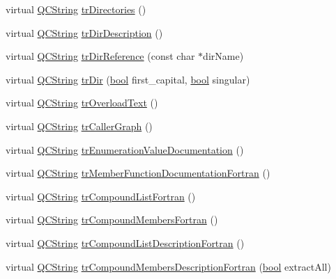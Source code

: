 \begin{DoxyCompactItemize}
virtual \hyperlink{class_q_c_string}{Q\+C\+String} \hyperlink{class_translator_czech_a5a70049ad39f783d34fdff2e6a289d40}{tr\+Directories} ()
\item 
virtual \hyperlink{class_q_c_string}{Q\+C\+String} \hyperlink{class_translator_czech_afee6a3bd8f2562a1e1c30fd668bf6255}{tr\+Dir\+Description} ()
\item 
virtual \hyperlink{class_q_c_string}{Q\+C\+String} \hyperlink{class_translator_czech_a749cbb6588827df5eaf78e857142d6b3}{tr\+Dir\+Reference} (const char $\ast$dir\+Name)
\item 
virtual \hyperlink{class_q_c_string}{Q\+C\+String} \hyperlink{class_translator_czech_ae31ae6026b12ff3423988ec06d2ba997}{tr\+Dir} (\hyperlink{qglobal_8h_a1062901a7428fdd9c7f180f5e01ea056}{bool} first\+\_\+capital, \hyperlink{qglobal_8h_a1062901a7428fdd9c7f180f5e01ea056}{bool} singular)
\item 
virtual \hyperlink{class_q_c_string}{Q\+C\+String} \hyperlink{class_translator_czech_adfb2800acfda8d8c258efd75b5bc7721}{tr\+Overload\+Text} ()
\item 
virtual \hyperlink{class_q_c_string}{Q\+C\+String} \hyperlink{class_translator_czech_a2277c8495360bda093341137b440e23c}{tr\+Caller\+Graph} ()
\item 
virtual \hyperlink{class_q_c_string}{Q\+C\+String} \hyperlink{class_translator_czech_a8b90e598df424c126b7413fe33134ec8}{tr\+Enumeration\+Value\+Documentation} ()
\item 
virtual \hyperlink{class_q_c_string}{Q\+C\+String} \hyperlink{class_translator_czech_ae1c9fbd277a3a3f61bbb2c953fe86585}{tr\+Member\+Function\+Documentation\+Fortran} ()
\item 
virtual \hyperlink{class_q_c_string}{Q\+C\+String} \hyperlink{class_translator_czech_aed6713142c9249fc0566224917208360}{tr\+Compound\+List\+Fortran} ()
\item 
virtual \hyperlink{class_q_c_string}{Q\+C\+String} \hyperlink{class_translator_czech_ad2f8f61b7d7d3dbac0737ce650533c7a}{tr\+Compound\+Members\+Fortran} ()
\item 
virtual \hyperlink{class_q_c_string}{Q\+C\+String} \hyperlink{class_translator_czech_ace1c18e4f6116a301f6a4ca57e06ac4a}{tr\+Compound\+List\+Description\+Fortran} ()
\item 
virtual \hyperlink{class_q_c_string}{Q\+C\+String} \hyperlink{class_translator_czech_ad88edc6deb69f9a1e4b28cd59acf4c3a}{tr\+Compound\+Members\+Description\+Fortran} (\hyperlink{qglobal_8h_a1062901a7428fdd9c7f180f5e01ea056}{bool} extract\+All)
\item 

\end{DoxyCompactItemize}
